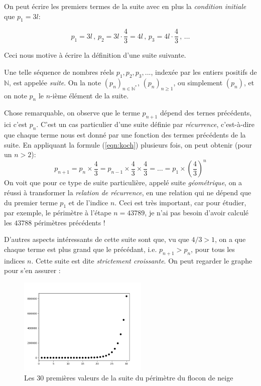 On peut écrire les premiers termes de la suite avec en plus la \emph{condition initiale} que $p_1= 3l$:

$$ p_1 = 3l \, , \,  p_2 = 3l \cdot \frac{4}{3} = 4l \, , \, p_3 = 4l \cdot \frac{4}{3} \, , \, \dots$$

Ceci nous motive à écrire la définition d'une suite suivante.

\begin{boxdef}[Suite]
Une telle séquence de nombres réels $p_1, p_2, p_3, ...$, indexée par les entiers positifs de $\mathbb N$, est appelée \emph{suite}. On la note $(p_n)_{n \in \mathbb{N}^*}$, $(p_n)_{n \geq 1}$, ou simplement $(p_n)$, et on note $p_n$ le $n$-ième élément de la suite.
\label{def:suite}
\end{boxdef}

Chose remarquable, on observe que le terme $p_{n+1}$ dépend des ternes précédents, ici c'est $p_n$.
 C'est un cas particulier d'une suite définie par \emph{récurrence}, c'est-à-dire que chaque terme nous est donné par une fonction des termes précédents de la suite.
En appliquant la formule (\ref{eqn:koch}) plusieurs fois, on peut obtenir (pour un $n>2$): 
\begin{equation}
    p_{n+1} = p_n\times \frac{4}{3} = p_{n-1}\times \frac{4}{3}\times \frac{4}{3} = \dots = p_1\times\left(\frac{4}{3}\right)^n
\end{equation}
On voit que pour ce type de suite particulière, appelé suite \emph{géométrique}, on a réussi à transformer la \emph{relation de récurrence}, en une relation qui ne dépend que du premier terme $p_1$ et de l'indice $n$. Ceci est très important, car pour étudier, par exemple, le périmètre à l'étape $n=43789$, je n'ai pas besoin d'avoir calculé les $43788$ périmètres précédents !

D'autres aspects intéressants de cette suite sont que, vu que $4/3 > 1$, on a que chaque terme est plus grand que le précédant, i.e. $p_{n+1} > p_n$, pour tous les indices $n$. Cette suite est dite \emph{strictement croissante}. On peut regarder le graphe pour s'en assurer :

\begin{figure}[H]
\centering \includegraphics[width = 0.55\textwidth]{./assets/imgs/fibonacci.png}
\caption{Les 30 premières valeurs de la suite du périmètre du flocon de neige}
\label{fig:fibonacci}
\end{figure}

